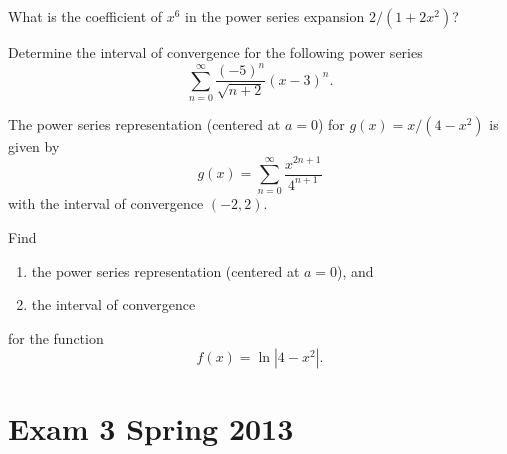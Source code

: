 \begin{problem}
What is the coefficient of $x^6$ in the power series expansion
$2/(1+2x^2)$?
\end{problem}
\begin{problem}
Determine the interval of convergence for the following power series
\[
\sum_{n=0}^\infty\frac{(-5)^n}{\sqrt{n+2}}(x-3)^n.
\]
\end{problem}
\begin{problem}
The power series representation (centered at $a=0$) for $g(x)=x/(4-x^2)$ is
given by
\[
g(x)=\sum_{n=0}^\infty\frac{x^{2n+1}}{4^{n+1}}
\]
with the interval of convergence $(-2,2)$.

Find
\begin{enumerate}[label=(\alph*)]
\item the power series representation (centered at $a=0$), and
\item the interval of convergence
\end{enumerate}
for the function
\[
f(x)=\ln|4-x^2|.
\]
\end{problem}
\section{Exam 3 Spring 2013}
\setcounter{exercise}{0}


